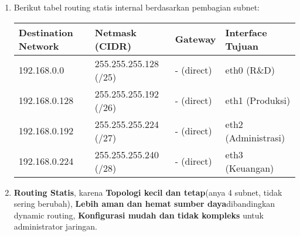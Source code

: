 \begin{enumerate}
	\item Berikut tabel routing statis internal berdasarkan pembagian subnet:

	\begin{table}[h!]
		\centering
		\begin{tabular}{|l|l|l|l|}
		\hline
		\textbf{Destination Network} & \textbf{Netmask (CIDR)} & \textbf{Gateway} & \textbf{Interface Tujuan} \\ \hline
		192.168.0.0                  & 255.255.255.128 (/25)   & - (direct)       & eth0 (R\&D)               \\ \hline
		192.168.0.128                & 255.255.255.192 (/26)   & - (direct)       & eth1 (Produksi)           \\ \hline
		192.168.0.192                & 255.255.255.224 (/27)   & - (direct)       & eth2 (Administrasi)       \\ \hline
		192.168.0.224                & 255.255.255.240 (/28)   & - (direct)       & eth3 (Keuangan)           \\ \hline
		\end{tabular}
	\end{table}

	\item \textbf{Routing Statis}, karena \textbf{Topologi kecil dan tetap}(anya 4 subnet, tidak sering berubah),
	\textbf{Lebih aman dan hemat sumber daya}dibandingkan dynamic routing,
	\textbf{Konfigurasi mudah dan tidak kompleks} untuk administrator jaringan.
		
\end{enumerate}